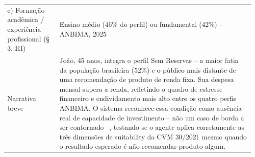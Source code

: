 \begin{quadro}[htbp]
\begin{tabular}{p{5cm}p{8cm}}
    \quad c) Forma\c{c}\~ao acad\^emica / experi\^encia profissional (\S\,3\textordmasculine{}, III) & Ensino m\'edio (46\% do perfil) ou fundamental (42\%) -- ANBIMA, 2025 \\
    Narrativa breve & Jo\~ao, 45 anos, integra o perfil Sem Reservas -- a maior fatia da popula\c{c}\~ao brasileira (52\%) e o p\'ublico mais distante de uma recomenda\c{c}\~ao de produto de renda fixa. Sua despesa mensal supera a renda, refletindo o quadro de estresse financeiro e endividamento mais alto entre os quatro perfis ANBIMA. O sistema reconhece essa condi\c{c}\~ao como aus\^encia real de capacidade de investimento -- n\~ao um caso de borda a ser contornado --, testando se o agente aplica corretamente as tr\^es dimens\~oes de suitability da CVM 30/2021 mesmo quando o resultado esperado \'e n\~ao recomendar produto algum. \\
    \bottomrule
  \end{tabular}
\end{quadro}

